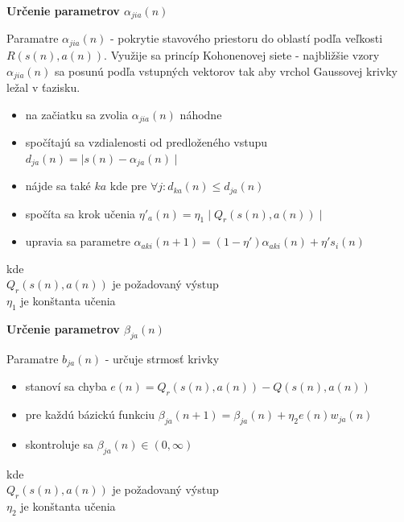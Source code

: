 \documentclass[xcolor=dvipsnames]{beamer}
\begin{document}
\begin{frame}{\bf Určenie parametrov $\alpha_{jia}(n)$}

Paramatre $\alpha_{jia}(n)$ - pokrytie stavového priestoru do oblastí podľa veľkosti $R(s(n), a(n))$.
Využije sa princíp Kohonenovej siete - najbližšie vzory $\alpha_{jia}(n)$ sa posunú podľa vstupných
vektorov tak aby vrchol Gaussovej krivky ležal v ťazisku.

\begin{itemize}
  \item na začiatku sa zvolia $\alpha_{jia}(n)$ náhodne
  \item spočítajú sa vzdialenosti od predloženého vstupu $d_{ja}(n) = \mid s(n) - \alpha_{ja}(n) \mid$
  \item nájde sa také $ka$ kde pre $\forall{j} : d_{ka}(n) \leq d_{ja}(n)$
  \item spočíta sa krok učenia $\eta'_a(n) = \eta_1 \mid Q_r(s(n), a(n)) \mid$
  \item upravia sa parametre $\alpha_{aki}(n+1) = (1 - \eta')\alpha_{aki}(n) + \eta' s_{i}(n)$
\end{itemize}
kde \\
$Q_r(s(n), a(n))$ je požadovaný výstup \\
$\eta_1$ je konštanta učenia
\end{frame}

\begin{frame}{\bf Určenie parametrov $\beta_{ja}(n)$}

Paramatre $b_{ja}(n)$ - určuje strmosť krivky

\begin{itemize}
\item stanoví sa chyba $e(n) = Q_r(s(n), a(n)) - Q(s(n), a(n))$
\item pre každú bázickú funkciu  $\beta_{ja}(n+1)= \beta_{ja}(n) + \eta_2 e(n)w_{ja}(n)$
\item skontroluje sa $\beta_{ja}(n) \in (0, \infty)$
\end{itemize}

kde \\
$Q_r(s(n), a(n))$ je požadovaný výstup \\
$\eta_2$ je konštanta učenia \\

\end{frame}
\end{document}
